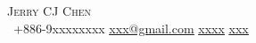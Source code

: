 \begin{center}
    {\Huge \scshape Jerry CJ Chen} \\ \vspace{1pt}
     \ \small +886-9xxxxxxxx \quad
    \href{mailto:xxx@gmail.com}{ \underline{xxx@gmail.com}} \quad
    \href{https://www.linkedin.com/in/xxxxxx/}{ \underline{xxxx}} \quad
    \href{https://github.com/xxxx}{ \underline{xxx}}
\end{center}